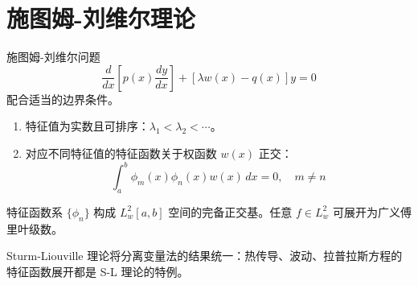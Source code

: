 ﻿\chapter{施图姆-刘维尔理论}

\begin{mydefinition}{施图姆-刘维尔问题}
\[
\frac{d}{dx}\left[p(x)\frac{dy}{dx}\right]+[\lambda w(x)-q(x)]y=0
\]
配合适当的边界条件。
\end{mydefinition}

\begin{theorem}[特征值性质]
\begin{enumerate}
	\item 特征值为实数且可排序：$\lambda_1<\lambda_2<\cdots$。
	\item 对应不同特征值的特征函数关于权函数 $w(x)$ 正交：
	\[
	\int_a^b\phi_m(x)\phi_n(x)w(x)\,dx=0,\quad m\neq n
	\]
\end{enumerate}
\end{theorem}

\begin{theorem}[完备性]
特征函数系 $\{\phi_n\}$ 构成 $L^2_w[a,b]$ 空间的完备正交基。任意 $f\in L^2_w$ 可展开为广义傅里叶级数。
\end{theorem}

\begin{remark}
Sturm-Liouville 理论将分离变量法的结果统一：热传导、波动、拉普拉斯方程的特征函数展开都是 S-L 理论的特例。
\end{remark}
